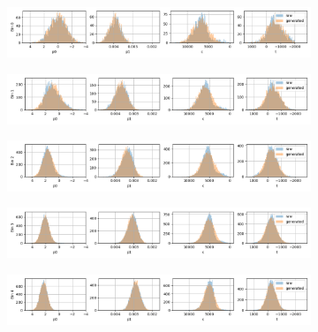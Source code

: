 \begin{figure}[H]
    \centering
\begin{subfigure}[b]{\textwidth}
    \centering
    \includegraphics[width=\linewidth]{figures/chapter4/surrogates/p3_histos_post_0.png}
  \end{subfigure}
\begin{subfigure}[b]{\textwidth}
    \centering
    \includegraphics[width=\linewidth]{figures/chapter4/surrogates/p3_histos_post_1.png}
  \end{subfigure}
\begin{subfigure}[b]{\textwidth}
    \centering
    \includegraphics[width=\linewidth]{figures/chapter4/surrogates/p3_histos_post_2.png}
  \end{subfigure}
\begin{subfigure}[b]{\textwidth}
    \centering
    \includegraphics[width=\linewidth]{figures/chapter4/surrogates/p3_histos_post_3.png}
  \end{subfigure}
\begin{subfigure}[b]{\textwidth}
    \centering
    \includegraphics[width=\linewidth]{figures/chapter4/surrogates/p3_histos_post_4.png}

\end{subfigure}
\end{figure}
